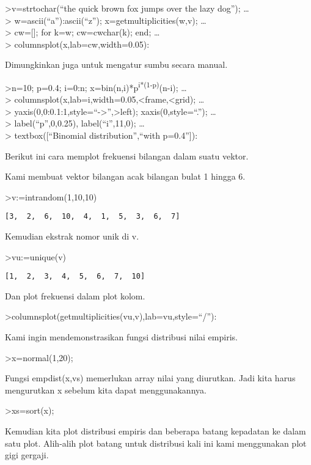 \documentclass[
]{book}
\begin{document}
\textgreater v=strtochar(``the quick brown fox jumps over the lazy dog''); \ldots{}\\
\textgreater{} w=ascii(``a''):ascii(``z''); x=getmultiplicities(w,v); \ldots{}\\
\textgreater{} cw={[}{]}; for k=w; cw=cw\textbar char(k); end; \ldots{}\\
\textgreater{} columnsplot(x,lab=cw,width=0.05):

Dimungkinkan juga untuk mengatur sumbu secara manual.

\textgreater n=10; p=0.4; i=0:n; x=bin(n,i)*p\textsuperscript{i*(1-p)}(n-i); \ldots{}\\
\textgreater{} columnsplot(x,lab=i,width=0.05,\textless frame,\textless grid); \ldots{}\\
\textgreater{} yaxis(0,0:0.1:1,style=``-\textgreater{}'',\textgreater left); xaxis(0,style=``.''); \ldots{}\\
\textgreater{} label(``p'',0,0.25), label(``i'',11,0); \ldots{}\\
\textgreater{} textbox({[}``Binomial distribution'',``with p=0.4''{]}):

Berikut ini cara memplot frekuensi bilangan dalam suatu vektor.

Kami membuat vektor bilangan acak bilangan bulat 1 hingga 6.

\textgreater v:=intrandom(1,10,10)

\begin{verbatim}
[3,  2,  6,  10,  4,  1,  5,  3,  6,  7]
\end{verbatim}

Kemudian ekstrak nomor unik di v.

\textgreater vu:=unique(v)

\begin{verbatim}
[1,  2,  3,  4,  5,  6,  7,  10]
\end{verbatim}

Dan plot frekuensi dalam plot kolom.

\textgreater columnsplot(getmultiplicities(vu,v),lab=vu,style=``/''):

Kami ingin mendemonstrasikan fungsi distribusi nilai empiris.

\textgreater x=normal(1,20);

Fungsi empdist(x,vs) memerlukan array nilai yang diurutkan. Jadi kita harus mengurutkan x sebelum kita dapat menggunakannya.

\textgreater xs=sort(x);

Kemudian kita plot distribusi empiris dan beberapa batang kepadatan ke dalam satu plot. Alih-alih plot batang untuk distribusi kali ini kami menggunakan plot gigi gergaji.
\end{document}
